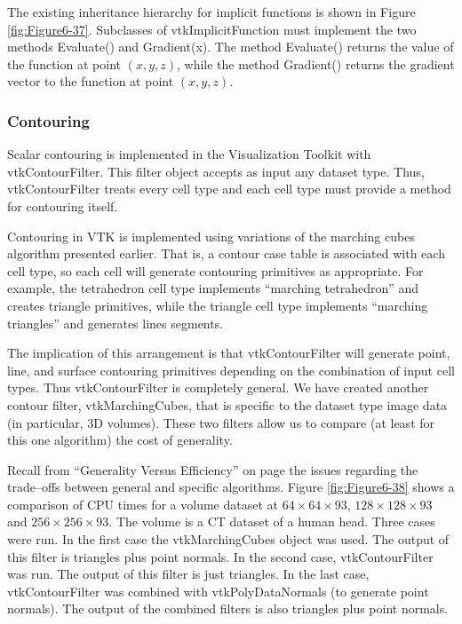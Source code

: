 The existing inheritance hierarchy for implicit functions is shown in Figure \ref{fig:Figure6-37}. Subclasses of vtkImplicitFunction must implement the two methods Evaluate() and Gradient(x). The method Evaluate() returns the value of the function at point $(x,y,z)$, while the method Gradient() returns the gradient vector to the function at point $(x,y,z)$.

\subsubsection{Contouring}

Scalar contouring is implemented in the Visualization Toolkit with vtkContourFilter. This filter object accepts as input any dataset type. Thus, vtkContourFilter treats every cell type and each cell type must provide a method for contouring itself.

Contouring in VTK is implemented using variations of the marching cubes algorithm presented earlier. That is, a contour case table is associated with each cell type, so each cell will generate contouring primitives as appropriate. For example, the tetrahedron cell type implements ``marching tetrahedron'' and creates triangle primitives, while the triangle cell type implements ``marching triangles'' and generates lines segments.

The implication of this arrangement is that vtkContourFilter will generate point, line, and surface contouring primitives depending on the combination of input cell types. Thus vtkContourFilter is completely general. We have created another contour filter, vtkMarchingCubes, that is specific to the dataset type image data (in particular, 3D volumes). These two filters allow us to compare (at least for this one algorithm) the cost of generality.

Recall from ``Generality Versus Efficiency'' on page \pageref{subsec:benerality_vs_efficiency} the issues regarding the trade--offs between general and specific algorithms. Figure \ref{fig:Figure6-38} shows a comparison of CPU times for a volume dataset at $64 \times 64\times 93$, $128 \times 128\times 93$ and $256 \times 256\times 93$. The volume is a CT dataset of a human head. Three cases were run. In the first case the  vtkMarchingCubes object was used. The output of this filter is triangles plus point normals. In the second case, vtkContourFilter was run. The output of this filter is just triangles. In the last case, vtkContourFilter was combined with vtkPolyDataNormals (to generate point normals). The output of the combined filters is also triangles plus point normals.

